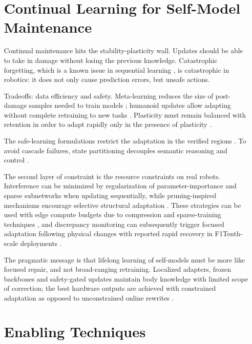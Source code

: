 \documentclass[11pt,a4paper]{article}
\begin{document}
\section{Continual Learning for Self-Model Maintenance}
\label{sec:continual_learning}

Continual maintenance hits the stability-plasticity wall. Updates should be able to take in damage without losing the previous knowledge. Catastrophic forgetting, which is a known issue in sequential learning \cite{mccloskey1989catastrophic,french1999catastrophic}, is catastrophic in robotics: it does not only cause prediction errors, but unsafe actions.

Tradeoffs: data efficiency and safety. Meta-learning reduces the size of post-damage samples needed to train models \cite{finn2017maml}; humanoid updates allow adapting without complete retraining to new tasks \cite{wang2026fast}. Plasticity must remain balanced with retention in order to adapt rapidly only in the presence of plasticity \cite{grossberg1987competitive,mermillod2013stability}.

The safe-learning formulations restrict the adaptation in the verified regions \cite{brunke2021safe}. To avoid cascade failures, state partitioning decouples semantic reasoning and control \cite{zhao2026tabletop}.

The second layer of constraint is the resource constraints on real robots. Interference can be minimized by regularization of parameter-importance and sparse subnetworks when updating sequentially, while pruning-inspired mechanisms encourage selective structural adaptation \cite{kirkpatrick2017overcoming,frankle2018lottery}. These strategies can be used with edge compute budgets due to compression and sparse-training techniques \cite{han2015deep,mocanu2018scalable}, and discrepancy monitoring can subsequently trigger focused adaptation following physical changes with reported rapid recovery in F1Tenth-scale deployments \cite{domberg2026selfadapting}.

The pragmatic message is that lifelong learning of self-models must be more like focused repair, and not broad-ranging retraining. Localized adapters, frozen backbones and safety-gated updates maintain body knowledge with limited scope of correction; the best hardware outputs are achieved with constrained adaptation as opposed to unconstrained online rewrites \cite{finn2017maml,wang2026fast,brunke2021safe}.



\section{Enabling Techniques}
\label{sec:enabling}
\end{document}
